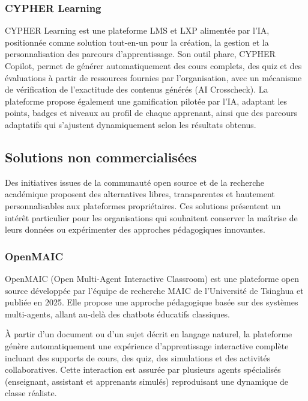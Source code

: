 \subsubsection{CYPHER Learning}CYPHER Learning \cite{cypherLearning} est une plateforme LMS et LXP alimentée par l'IA, 
positionnée comme solution tout-en-un pour la création, la gestion et la personnalisation 
des parcours d'apprentissage. Son outil phare, CYPHER Copilot, permet de générer 
automatiquement des cours complets, des quiz et des évaluations à partir de ressources 
fournies par l'organisation, avec un mécanisme de vérification de l'exactitude des 
contenus générés (AI Crosscheck). La plateforme propose également une gamification pilotée 
par l'IA, adaptant les points, badges et niveaux au profil de chaque apprenant, ainsi 
que des parcours adaptatifs qui s'ajustent dynamiquement selon les résultats obtenus.






\subsection{Solutions non commercialisées}
Des initiatives issues de la communauté open source et de la recherche académique proposent des alternatives libres, transparentes et hautement personnalisables aux plateformes propriétaires. Ces solutions présentent un intérêt particulier pour les organisations qui souhaitent conserver la maîtrise de leurs données ou expérimenter des approches pédagogiques innovantes.

\subsubsection{OpenMAIC}

OpenMAIC \cite{openmaic} (Open Multi-Agent Interactive Classroom) est une plateforme open source développée par l’équipe de recherche MAIC de l’Université de Tsinghua et publiée en 2025. Elle propose une approche pédagogique basée sur des systèmes multi-agents, allant au-delà des chatbots éducatifs classiques.

À partir d’un document ou d’un sujet décrit en langage naturel, la plateforme génère automatiquement une expérience d’apprentissage interactive complète incluant des supports de cours, des quiz, des simulations et des activités collaboratives. Cette interaction est assurée par plusieurs agents spécialisés (enseignant, assistant et apprenants simulés) reproduisant une dynamique de classe réaliste.

